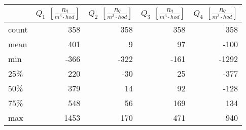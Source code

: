 \begin{tabular}{lrrrr}
\toprule
{} &  $Q_1$ $\left[\si{\frac{Bq}{m^3\cdot hod}}\right]$ &  $Q_2$ $\left[\si{\frac{Bq}{m^3\cdot hod}}\right]$ &  $Q_3$ $\left[\si{\frac{Bq}{m^3\cdot hod}}\right]$ &  $Q_4$ $\left[\si{\frac{Bq}{m^3\cdot hod}}\right]$ \\
\midrule
count &                                                358 &                                                358 &                                                358 &                                                358 \\
mean  &                                                401 &                                                  9 &                                                 97 &                                               -100 \\
min   &                                               -366 &                                               -322 &                                               -161 &                                              -1292 \\
25\%   &                                                220 &                                                -30 &                                                 25 &                                               -377 \\
50\%   &                                                379 &                                                 14 &                                                 92 &                                               -128 \\
75\%   &                                                548 &                                                 56 &                                                169 &                                                134 \\
max   &                                               1453 &                                                170 &                                                471 &                                                940 \\
\bottomrule
\end{tabular}
